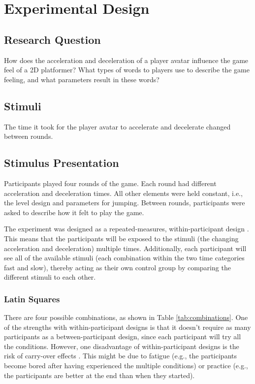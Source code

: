 \section{Experimental Design} \label{experimentalDesign}
\subsection{Research Question}
How does the acceleration and deceleration of a player avatar influence the game feel of a 2D platformer? What types of words to players use to describe the game feeling, and what parameters result in these words?

\subsection{Stimuli}
The time it took for the player avatar to accelerate and decelerate changed between rounds.

\subsection{Stimulus Presentation}
Participants played four rounds of the game. Each round had different acceleration and deceleration times. All other elements were held constant, i.e., the level design and parameters for jumping. Between rounds, participants were asked to describe how it felt to play the game.

The experiment was designed as a repeated-measures, within-participant design \cite{cunningham}. This means that the participants will be exposed to the stimuli (the changing acceleration and deceleration) multiple times. Additionally, each participant will see all of the available stimuli (each combination within the two time categories fast and slow), thereby acting as their own control group by comparing the different stimuli to each other.

\subsubsection{Latin Squares} \label{latinSection}
There are four possible combinations, as shown in Table \ref{tab:combinations}. One of the strengths with within-participant designs is that it doesn't require as many participants as a between-participant design, since each participant will try all the conditions. However, one disadvantage of within-participant designs is the risk of carry-over effects \cite{experimental1}. This might be due to fatigue (e.g., the participants become bored after having experienced the multiple conditions) or practice (e.g., the participants are better at the end than when they started).

